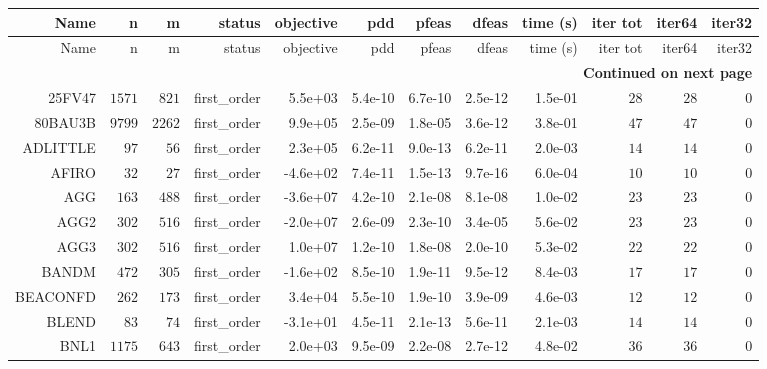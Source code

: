 \begin{longtable}{rrrrrrrrrrrr}
  \hline
  Name & n & m & status & objective & pdd & pfeas & dfeas & time (s) & iter tot & iter64 & iter32 \\\hline
  \endfirsthead
  \hline
  Name & n & m & status & objective & pdd & pfeas & dfeas & time (s) & iter tot & iter64 & iter32 \\\hline
  \endhead
  \hline
  \multicolumn{12}{r}{{\bfseries Continued on next page}}\\
  \hline
  \endfoot
  \endlastfoot
  25FV47 & \(  1571\) & \(   821\) & first\_order &  5.5e+03 &  5.4e-10 &  6.7e-10 &  2.5e-12 &  1.5e-01 & \(    28\) & \(    28\) & \(     0\) \\
  80BAU3B & \(  9799\) & \(  2262\) & first\_order &  9.9e+05 &  2.5e-09 &  1.8e-05 &  3.6e-12 &  3.8e-01 & \(    47\) & \(    47\) & \(     0\) \\
  ADLITTLE & \(    97\) & \(    56\) & first\_order &  2.3e+05 &  6.2e-11 &  9.0e-13 &  6.2e-11 &  2.0e-03 & \(    14\) & \(    14\) & \(     0\) \\
  AFIRO & \(    32\) & \(    27\) & first\_order & -4.6e+02 &  7.4e-11 &  1.5e-13 &  9.7e-16 &  6.0e-04 & \(    10\) & \(    10\) & \(     0\) \\
  AGG & \(   163\) & \(   488\) & first\_order & -3.6e+07 &  4.2e-10 &  2.1e-08 &  8.1e-08 &  1.0e-02 & \(    23\) & \(    23\) & \(     0\) \\
  AGG2 & \(   302\) & \(   516\) & first\_order & -2.0e+07 &  2.6e-09 &  2.3e-10 &  3.4e-05 &  5.6e-02 & \(    23\) & \(    23\) & \(     0\) \\
  AGG3 & \(   302\) & \(   516\) & first\_order &  1.0e+07 &  1.2e-10 &  1.8e-08 &  2.0e-10 &  5.3e-02 & \(    22\) & \(    22\) & \(     0\) \\
  BANDM & \(   472\) & \(   305\) & first\_order & -1.6e+02 &  8.5e-10 &  1.9e-11 &  9.5e-12 &  8.4e-03 & \(    17\) & \(    17\) & \(     0\) \\
  BEACONFD & \(   262\) & \(   173\) & first\_order &  3.4e+04 &  5.5e-10 &  1.9e-10 &  3.9e-09 &  4.6e-03 & \(    12\) & \(    12\) & \(     0\) \\
  BLEND & \(    83\) & \(    74\) & first\_order & -3.1e+01 &  4.5e-11 &  2.1e-13 &  5.6e-11 &  2.1e-03 & \(    14\) & \(    14\) & \(     0\) \\
  BNL1 & \(  1175\) & \(   643\) & first\_order &  2.0e+03 &  9.5e-09 &  2.2e-08 &  2.7e-12 &  4.8e-02 & \(    36\) & \(    36\) & \(     0\) \\

\end{longtable}
